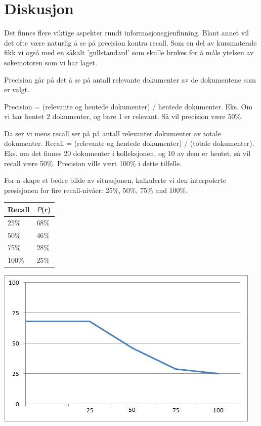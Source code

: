 \section{Diskusjon}
\label{sec:diskusjon}

Det finnes flere viktige aspekter rundt informasjonsgjenfinning. Blant annet vil det ofte være naturlig å se på precision kontra recall. Som en del av kursmaterale fikk vi også med en såkalt 'gullstandard' som skulle brukes for å måle ytelsen av søkemotoren som vi har laget.

Precision går på det å se på antall relevante dokumenter av de dokumentene som er valgt. 

Precision = (relevante og hentede dokumenter) / hentede dokumenter. Eks. Om vi har hentet 2 dokumenter, og bare 1 er relevant. Så vil precision være 50\%.

Da ser vi mens recall ser på på antall relevanter dokumenter av totale dokumenter. Recall = (relevante og hentede dokumenter) / (totale dokumenter). Eks. om det finnes 20 dokumenter i kolleksjonen, og 10 av dem er hentet, så vil recall være 50\%. Precision ville vært 100\% i dette tilfelle. 


\newline
For å skape et bedre bilde av situasjonen, kalkulerte vi den interpolerte presisjonen for fire recall-nivåer: 25\%, 50\%, 75\% and 100\%.

\begin{tabular}{|m{}|m{}|}
\hline
Recall & $\overline{P}$(r) \\ \hline
25\% & 68\% \\ \hline
50\% & 46\% \\ \hline
75\% & 28\% \\ \hline
100\% & 25\% \\ \hline
\end{tabular}

\begin{center}
\includegraphics{section/recallgraf}
\end{center}

